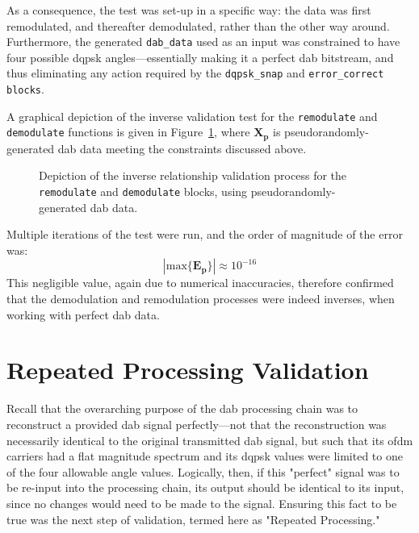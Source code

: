 \documentclass[class=report,11pt,crop=false]{standalone}
\begin{document}
As a consequence, the test was set-up in a specific way: the data was first remodulated, and thereafter demodulated, rather than the other way around. Furthermore, the generated \texttt{dab\_data} used as an input was constrained to have four possible \gls{dqpsk} angles---essentially making it a perfect \gls{dab} bitstream, and thus eliminating any action required by the \texttt{dqpsk\_snap} and \texttt{error\_correct blocks}.

A graphical depiction of the inverse validation test for the \texttt{remodulate} and \texttt{demodulate} functions is given in Figure~\ref{fig:inverse-remod-demod}, where \(\mathbf{X_p}\) is pseudorandomly-generated \gls{dab} data meeting the constraints discussed above.
\begin{figure}[htbp]
  \centering
  \captionsetup{type=figure}
  \def\svgwidth{\linewidth}
  { %
      }
  \caption{Depiction of the inverse relationship validation process for the \texttt{remodulate} and \texttt{demodulate} blocks, using pseudorandomly-generated \gls{dab} data.}
  \label{fig:inverse-remod-demod}
\end{figure}

Multiple iterations of the test were run, and the order of magnitude of the error was:
\begin{equation}
  \left| \mathrm{max} \{ \mathbf{E_p} \} \right| \approx 10^{-16}
\end{equation}
This negligible value, again due to numerical inaccuracies, therefore confirmed that the demodulation and remodulation processes were indeed inverses, when working with perfect \gls{dab} data.

\section{Repeated Processing Validation}
Recall that the overarching purpose of the \gls{dab} processing chain was to reconstruct a provided \gls{dab} signal perfectly---not that the reconstruction was necessarily identical to the original transmitted \gls{dab} signal, but such that its \gls{ofdm} carriers had a flat magnitude spectrum and its \gls{dqpsk} values were limited to one of the four allowable angle values. Logically, then, if this "perfect" signal was to be re-input into the processing chain, its output should be identical to its input, since no changes would need to be made to the signal. Ensuring this fact to be true was the next step of validation, termed here as "Repeated Processing."
\end{document}
